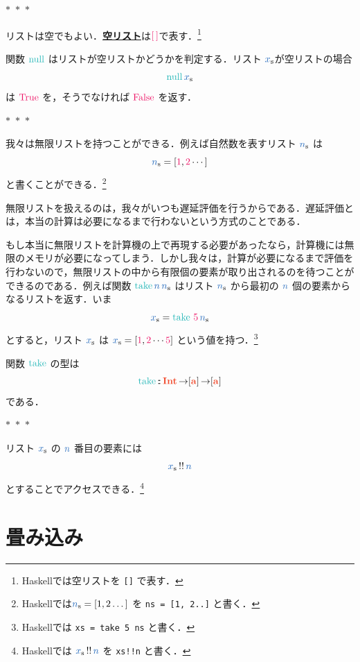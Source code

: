 \documentclass[a5paper,twoside,fleqn,draft]{jsbook}
\def\constantColor{WildStrawberry}
\def\varColor{NavyBlue}
\def\funcColor{BlueGreen}
\def\typeColor{RedOrange}
\newcommand{\separator}{\begin{center}$*$~$*$~$*$\end{center}}
\newcommand{\programminglanguage}[1]{\textsf{#1}}
\newcommand{\haskell}{\programminglanguage{Haskell}}
\newcommand{\keyword}[1]{{\underline{\textbf{#1}}}}
\newcommand{\code}[1]{\texttt{#1}}
\newcommand{\mConstant}[1]{\textcolor{\constantColor}{#1}}
\newcommand{\mSpecialConstant}[1]{\textcolor{\constantColor}{\textrm{#1}}}
\newcommand{\mOneNumber}{{\mConstant{1}}}
\newcommand{\mTwoNumber}{\mConstant{2}}
\newcommand{\mFiveNumber}{\mConstant{5}}
\newcommand{\mEmptyList}{{\textcolor{\constantColor}{[\,]}}}
\newcommand{\mFalse}{\mSpecialConstant{False}}
\newcommand{\mTrue}{\mSpecialConstant{True}}
\newcommand{\mVar}[1]{\textcolor{\varColor}{#1}}
\newcommand{\mNVar}{\mVar{n}}
\newcommand{\mSpecialFunc}[1]{\textcolor{\funcColor}{\textrm{#1}}}
\DeclareMathOperator{\mNull}{\mSpecialFunc{null}}
\DeclareMathOperator{\mTake}{\mSpecialFunc{take}}
\DeclareMathOperator{\mFuncArrow}{\rightarrow}
\DeclareMathOperator{\mIn}{{:\!:}}
\DeclareMathOperator{\mListAt}{!!}
\newcommand{\mType}[1]{\textcolor{\typeColor}{\mathbf{#1}}}
\newcommand{\mA}{\mType{a}}
\newcommand{\mIntType}{\mType{Int}}
\newcommand{\mList}[1]{\mVar{#1}_\mathrm{s}}
\begin{document}
\separator

リストは空でもよい．\keyword{空リスト}は$\mEmptyList$で表す．\footnote{\haskell では空リストを \code{[]} で表す．}

関数 $\mNull$ はリストが空リストかどうかを判定する．リスト $\mList{x}$が空リストの場合
\begin{equation}
  \mNull\mList{x}
\end{equation}
は $\mTrue$ を，そうでなければ $\mFalse$ を返す．

\separator

我々は無限リストを持つことができる．例えば自然数を表すリスト
$\mList{n}$ は
\begin{equation*}
  \mList{n}
  =[\mOneNumber,\mTwoNumber\dotsb]
\end{equation*}
と書くことができる．\footnote{\haskell では$\mList{n}=[1,2\dots]$ を \code{ns = [1, 2..]} と書く．}

無限リストを扱えるのは，我々がいつも遅延評価を行うからである．遅延評価とは，本当の計算は必要になるまで行わないという方式のことである．

もし本当に無限リストを計算機の上で再現する必要があったなら，計算機には無限のメモリが必要になってしまう．しかし我々は，計算が必要になるまで評価を行わないので，無限リストの中から有限個の要素が取り出されるのを待つことができるのである．例えば関数 $\mTake\mNVar\,\mList{n}$ はリスト $\mList{n}$ から最初の $\mNVar$ 個の要素からなるリストを返す．いま
\begin{equation*}
  \mList{x}
  =\mTake\,\mFiveNumber\,\mList{n}
\end{equation*}
とすると，リスト $\mList{x}$ は $\mList{x}=[\mOneNumber,\mTwoNumber\dotsb\mFiveNumber]$ という値を持つ．\footnote{\haskell では \code{xs = take 5 ns} と書く．}

関数 $\mTake$ の型は
\begin{equation}
  \mTake
  \mIn\mIntType\mFuncArrow[\mA]\mFuncArrow[\mA]
\end{equation}
である．

\separator

リスト $\mList{x}$ の $\mNVar$ 番目の要素には
\begin{equation}
  \mList{x}\mListAt\mNVar
\end{equation}
とすることでアクセスできる．\footnote{\haskell では $\mList{x}\mListAt\mNVar$ を \code{xs!!n} と書く．}

\section{畳み込み}
\label{sec:convolution}
\end{document}
